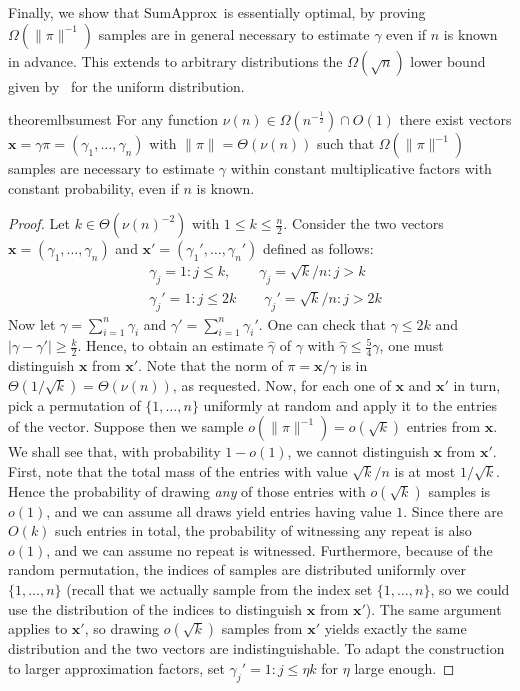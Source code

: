 \documentclass[a4paper,11pt]{article}
\newcommand{\sumest}{SumApprox}
\begin{document}
Finally, we show that \sumest\ is essentially optimal, by proving $\Omega(\|\pi\|^{-1})$ samples are in general necessary to estimate $\gamma$ even if $n$ is known in advance.
This extends to arbitrary distributions the $\Omega(\sqrt{n})$ lower bound given by~\cite{Motwani&2007} for the uniform distribution.
\begin{restatable}{theorem}{lbsumest}
\label{thm:lbsumest}
For any function $\nu(n) \in \Omega(n^{-\frac{1}{2}}) \cap O(1)$ there exist vectors $\mathbf{x} = \gamma \pi = (\gamma_1,\ldots,\gamma_n)$ with $\|\pi\| = \Theta(\nu(n))$ such that $\Omega(\|\pi\|^{-1})$ samples are necessary to estimate $\gamma$ within constant multiplicative factors with constant probability, even if $n$ is known.
\end{restatable}
\begin{proof}
\label{apx:sumlb}
Let $k \in \Theta(\nu(n)^{-2})$ with $1 \le k \le \frac{n}{2}$.
Consider the two vectors $\mathbf{x} = (\gamma_1,\ldots,\gamma_n)$ and $\mathbf{x}'= (\gamma_1',\ldots,\gamma_n')$ defined as follows:
\begin{align*}
&\gamma_j = 1 : j\le k, \qquad \gamma_j=\sqrt{k}/n : j>k\\
&\gamma_j' = 1 : j\le 2k \qquad \gamma_j'=\sqrt{k}/n : j>2k
\end{align*}
Now let $\gamma = \sum_{i=1}^n \gamma_i$ and $\gamma' = \sum_{i=1}^n \gamma_i'$.
One can check that $\gamma \le 2k$ and $|\gamma - \gamma'| \ge \frac{k}{2}$.
Hence, to obtain an estimate $\hat{\gamma}$ of $\gamma$ with $\hat{\gamma} \le \frac{5}{4}\gamma$, one must distinguish $\mathbf{x}$ from $\mathbf{x}'$.
Note that the norm of $\pi = \mathbf{x} / \gamma$ is in $\Theta(1/\sqrt{k}) = \Theta(\nu(n))$, as requested.
Now, for each one of $\mathbf{x}$ and $\mathbf{x}'$ in turn, pick a permutation of $\{1,\ldots,n\}$ uniformly at random and apply it to the entries of the vector.
Suppose then we sample $o(\|\pi\|^{-1}) = o(\sqrt{k})$ entries from $\mathbf{x}$.
We shall see that, with probability $1-o(1)$, we cannot distinguish $\mathbf{x}$ from $\mathbf{x}'$.
First, note that the total mass of the entries with value $\sqrt{k}/n$ is at most $1/\sqrt{k}$.
Hence the probability of drawing \emph{any} of those entries with $o(\sqrt{k})$ samples is $o(1)$, and we can assume all draws yield entries having value $1$.
Since there are $O(k)$ such entries in total, the probability of witnessing any repeat is also $o(1)$, and we can assume no repeat is witnessed.
Furthermore, because of the random permutation, the indices of samples are distributed uniformly over $\{1,\ldots,n\}$ (recall that we actually sample from the index set $\{1,\ldots,n\}$, so we could use the distribution of the indices to distinguish $\mathbf{x}$ from $\mathbf{x}'$).
The same argument applies to $\mathbf{x}'$, so drawing $o(\sqrt{k})$ samples from $\mathbf{x}'$ yields exactly the same distribution and the two vectors are indistinguishable.
To adapt the construction to larger approximation factors, set $\gamma_j' = 1 : j\le \eta k$ for $\eta$ large enough.
\end{proof}
\end{document}
